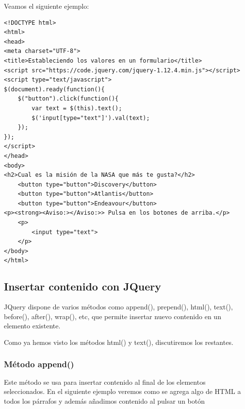 \documentclass[11pt]{article}
\begin{document}
\begin{itemize}
Veamos el siguiente ejemplo:

\begin{verbatim}
<!DOCTYPE html>
<html>
<head>
<meta charset="UTF-8">
<title>Estableciendo los valores en un formulario</title>
<script src="https://code.jquery.com/jquery-1.12.4.min.js"></script>
<script type="text/javascript">
$(document).ready(function(){
    $("button").click(function(){
        var text = $(this).text();
        $('input[type="text"]').val(text);
    });
});
</script>
</head>
<body>
<h2>Cual es la misión de la NASA que más te gusta?</h2>
    <button type="button">Discovery</button>
    <button type="button">Atlantis</button>
    <button type="button">Endeavour</button>
<p><strong><Aviso:></Aviso:>> Pulsa en los botones de arriba.</p>
    <p>
        <input type="text">
    </p>
</body>
</html>                                		
\end{verbatim}
\end{itemize}

\subsection*{Insertar contenido con JQuery}
\label{sec:org18ecd45}

JQuery dispone de varios métodos como append(), prepend(), html(), text(), before(), after(), wrap(), etc, que permite insertar nuevo contenido en un elemento existente.

Como ya hemos visto los métodos html() y text(), discutiremos los restantes.

\subsubsection*{Método append()}
\label{sec:org9bc0bed}

Este método se usa para insertar contenido al final de los elementos seleccionados. En el siguiente ejemplo veremos como se agrega algo de HTML a todos los párrafos y además añadimos contenido al pulsar un botón
\end{document}
